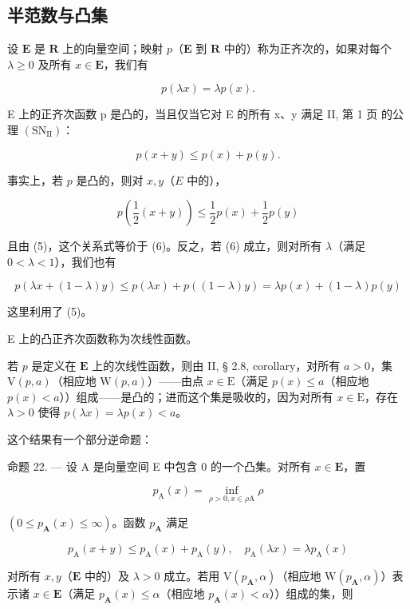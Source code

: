 \subsection{半范数与凸集}

设 \(\mathbf{E}\) 是 \(\mathbf{R}\) 上的向量空间；映射 \(p\)（\(\mathbf{E}\) 到 \(\mathbf{R}\) 中的）称为正齐次的，如果对每个 \(\lambda \geqslant 0\) 及所有 \(x \in \mathbf{E}\)，我们有

\[
p (\lambda x) = \lambda p (x).\tag{5}
\]

E 上的正齐次函数 p 是凸的，当且仅当它对 E 的所有 x、y 满足 II, 第 1 页 的公理 \((\mathrm{SN}_{\mathrm{II}})\)：

\[
p (x + y) \leqslant p (x) + p (y).\tag{6}
\]

事实上，若 \(p\) 是凸的，则对 \(x, y\)（\(E\) 中的），

\[
p \left(\frac {1}{2} (x + y)\right) \leqslant \frac {1}{2} p (x) + \frac {1}{2} p (y)
\]

且由 (5)，这个关系式等价于 (6)。反之，若 (6) 成立，则对所有 \(\lambda\)（满足 \(0 < \lambda < 1\)），我们也有

\[
p (\lambda x + (1 - \lambda) y) \leqslant p (\lambda x) + p ((1 - \lambda) y) = \lambda p (x) + (1 - \lambda) p (y)
\]

这里利用了 (5)。

E 上的凸正齐次函数称为次线性函数。

若 \(p\) 是定义在 \(\mathbf{E}\) 上的次线性函数，则由 II, § 2.8, corollary，对所有 \(a > 0\)，集 \(\mathrm{V}(p, a)\)（相应地 \(\mathrm{W}(p, a)\)）——由点 \(x \in \mathrm{E}\)（满足 \(p(x) \leqslant a\)（相应地 \(p(x) < a\)））组成——是凸的；进而这个集是吸收的，因为对所有 \(x \in \mathrm{E}\)，存在 \(\lambda > 0\) 使得 \(p(\lambda x) = \lambda p(x) < a\)。

这个结果有一个部分逆命题：

命题 22. --- 设 A 是向量空间 E 中包含 0 的一个凸集。对所有 \(x \in \mathbf{E}\)，置

\[
p _ {\mathrm{A}} (x) = \inf _ {\rho > 0, x \in \rho \mathrm{A}} \rho\tag{7}
\]

\((0 \leqslant p_{\mathbf{A}}(x) \leqslant \infty)\)。函数 \(p_{\mathbf{A}}\) 满足

\[
p _ {\mathrm{A}} (x + y) \leqslant p _ {\mathrm{A}} (x) + p _ {\mathrm{A}} (y), \quad p _ {\mathrm{A}} (\lambda x) = \lambda p _ {\mathrm{A}} (x)\tag{8}
\]

对所有 \(x, y\)（\(\mathbf{E}\) 中的）及 \(\lambda > 0\) 成立。若用 \(\mathrm{V}(p_{\mathbf{A}}, \alpha)\)（相应地 \(\mathrm{W}(p_{\mathbf{A}}, \alpha)\)）表示诸 \(x \in \mathbf{E}\)（满足 \(p_{\mathbf{A}}(x) \leqslant \alpha\)（相应地 \(p_{\mathbf{A}}(x) < \alpha\)））组成的集，则

